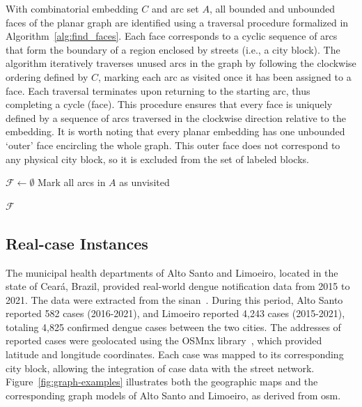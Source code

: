 With combinatorial embedding \( C \) and arc set \( A \), all bounded and unbounded faces of the planar graph are identified using a traversal procedure formalized in Algorithm~\ref{alg:find_faces}. Each face corresponds to a cyclic sequence of arcs that form the boundary of a region enclosed by streets (i.e., a city block). The algorithm iteratively traverses unused arcs in the graph by following the clockwise ordering defined by \( C \), marking each arc as visited once it has been assigned to a face. Each traversal terminates upon returning to the starting arc, thus completing a cycle (face). This procedure ensures that every face is uniquely defined by a sequence of arcs traversed in the clockwise direction relative to the embedding. It is worth noting that every planar embedding has one unbounded `outer' face encircling the whole graph. This outer face does not correspond to any physical city block, so it is excluded from the set of labeled blocks.

\begin{algorithm}[h!]
\caption{Face-finding Algorithm for Planar Embedding}\label{alg:find_faces}
\BlankLine

$\mathcal{F} \gets \emptyset$\;
Mark all arcs in $A$ as unvisited\;


\Return $\mathcal{F}$\;
\end{algorithm}

\subsection{Real-case Instances}\label{subsec:real_instances}

The municipal health departments of Alto Santo and Limoeiro, located in the state of Ceará, Brazil, provided real-world dengue notification data from 2015 to 2021. The data were extracted from the \gls{sinan}~\cite{laguardia:2004}. During this period, Alto Santo reported 582 cases (2016-2021), and Limoeiro reported 4,243 cases (2015-2021), totaling 4,825 confirmed dengue cases between the two cities. The addresses of reported cases were geolocated using the OSMnx library~\cite{boeing:2017}, which provided latitude and longitude coordinates. Each case was mapped to its corresponding city block, allowing the integration of case data with the street network. Figure~\ref{fig:graph-examples} illustrates both the geographic maps and the corresponding graph models of Alto Santo and Limoeiro, as derived from \gls{osm}. 

